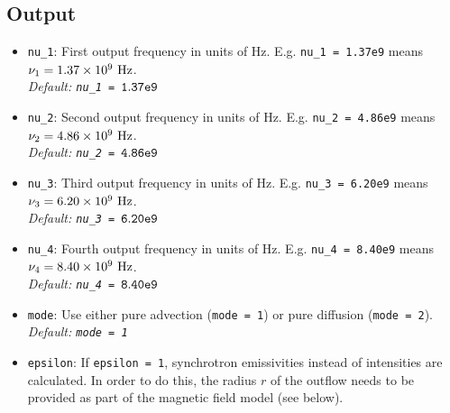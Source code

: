 \documentclass[11pt,twocolumn,a4paper]{article}
\begin{document}
\subsection{Output}
\begin{itemize}
\item {\tt nu\_1}: First output frequency in units of Hz. E.g. {\tt nu\_1 = 1.37e9} means $\nu_1=1.37\times 10^{9}~\rm Hz$.\\
\emph{Default: {\tt nu\_1 = $\tt 1.37e9$}}
\item {\tt nu\_2}: Second output frequency in units of Hz. E.g. {\tt nu\_2 = 4.86e9} means $\nu_2=4.86\times 10^{9}~\rm Hz$.\\
\emph{Default: {\tt nu\_2 = $\tt 4.86e9$}}
\item {\tt nu\_3}: Third output frequency in units of Hz. E.g. {\tt nu\_3 = 6.20e9} means $\nu_3=6.20\times 10^{9}~\rm Hz$.\\
\emph{Default: {\tt nu\_3 = $\tt 6.20e9$}}
\item {\tt nu\_4}: Fourth output frequency in units of Hz. E.g. {\tt nu\_4 = 8.40e9} means $\nu_4=8.40\times 10^{9}~\rm Hz$.\\
\emph{Default: {\tt nu\_4 = $\tt 8.40e9$}}
\item {\tt mode}: Use either pure advection ({\tt mode = 1}) or pure diffusion ({\tt mode = 2}).\\
\emph{Default: {\tt mode = 1}}
\item {\tt epsilon}: If {\tt epsilon = 1}, synchrotron emissivities instead of intensities are calculated. In order to do this, the radius $r$ of the outflow needs to be provided as part of the magnetic field model (see below).
\end{itemize}
\end{document}
